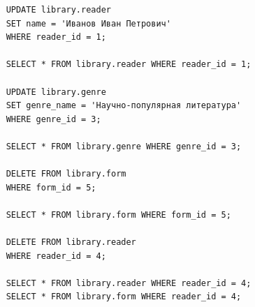 \begin{verbatim}
    UPDATE library.reader
    SET name = 'Иванов Иван Петрович'
    WHERE reader_id = 1;
    
    SELECT * FROM library.reader WHERE reader_id = 1;
    
    UPDATE library.genre
    SET genre_name = 'Научно-популярная литература'
    WHERE genre_id = 3;
    
    SELECT * FROM library.genre WHERE genre_id = 3;
    
    DELETE FROM library.form
    WHERE form_id = 5;
    
    SELECT * FROM library.form WHERE form_id = 5;
    
    DELETE FROM library.reader
    WHERE reader_id = 4;
    
    SELECT * FROM library.reader WHERE reader_id = 4;
    SELECT * FROM library.form WHERE reader_id = 4;
\end{verbatim}